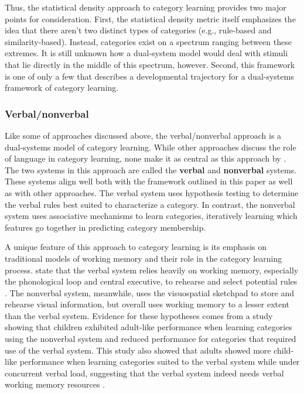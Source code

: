 \documentclass[../dissertation.tex]{subfiles}
\begin{document}
	Thus, the statistical density approach to category learning provides two major points for consideration. First, the statistical density metric itself emphasizes the idea that there aren't two distinct types of categories (e.g., rule-based and similarity-based). Instead, categories exist on a spectrum ranging between these extremes. It is still unknown how a dual-system model would deal with stimuli that lie directly in the middle of this spectrum, however. Second, this framework is one of only a few that describes a developmental trajectory for a dual-systems framework of category learning.
	
\subsubsection{Verbal/nonverbal}
	Like some of approaches discussed above, the verbal/nonverbal approach is a dual-systems model of category learning. While other approaches discuss the role of language in category learning, none make it as central as this approach by \citet{Minda2010}. The two systems in this approach are called the \textbf{verbal} and \textbf{nonverbal} systems. These systems align well both with the framework outlined in this paper as well as with other approaches. The verbal system uses hypothesis testing to determine the verbal rules best suited to characterize a category. In contrast, the nonverbal system uses associative mechanisms to learn categories, iteratively learning which features go together in predicting category membership. \par
	A unique feature of this approach to category learning is its emphasis on traditional models of working memory and their role in the category learning process. \citet{Minda2010} state that the verbal system relies heavily on working memory, especially the phonological loop and central executive, to rehearse and select potential rules \citep{Baddeley1974}. The nonverbal system, meanwhile, uses the visuospatial sketchpad to store and rehearse visual information, but overall uses working memory to a lesser extent than the verbal system. Evidence for these hypotheses comes from a study showing that children exhibited adult-like performance when learning categories using the nonverbal system and reduced performance for categories that required use of the verbal system. This study also showed that adults showed more child-like performance when learning categories suited to the verbal system while under concurrent verbal load, suggesting that the verbal system indeed needs verbal working memory resources \citep{Minda2008}. \par
\end{document}
